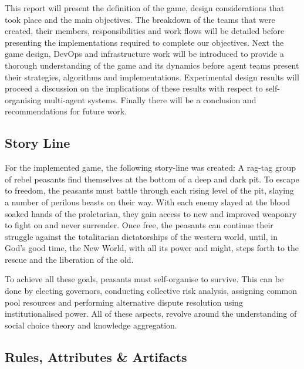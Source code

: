 This report will present the definition of the game, design considerations that took place and the main objectives. The breakdown of the teams that were created, their members, responsibilities and work flows will be detailed before presenting the implementations required to complete our objectives. Next the game design, DevOps and infrastructure work will be introduced to provide a thorough understanding of the game and its dynamics before agent teams present their strategies, algorithms and implementations. Experimental design results will proceed a discussion on the implications of these results with respect to self-organising multi-agent systems. Finally there will be a conclusion and recommendations for future work. 

\subsection{Story Line}\label{sec:story line}

For the implemented game, the following story-line was created: A rag-tag group of rebel peasants find themselves at the bottom of a deep and dark pit. To escape to freedom, the peasants must battle through each rising level of the pit, slaying a number of perilous beasts on their way. With each enemy slayed at the blood soaked hands of the proletarian, they gain access to new and improved weaponry to fight on and never surrender. Once free, the peasants can continue their struggle against the totalitarian dictatorships of the western world, until, in God's good time, the New World, with all its power and might, steps forth to the rescue and the liberation of the old. \cite{churchill} 

To achieve all these goals, peasants must self-organise to survive. This can be done by electing governors, conducting collective risk analysis, assigning common pool resources and performing alternative dispute resolution using institutionalised power. All of these aspects, revolve around the understanding of social choice theory and knowledge aggregation. 


\subsection{Rules, Attributes \& Artifacts}\label{sec:rules}

